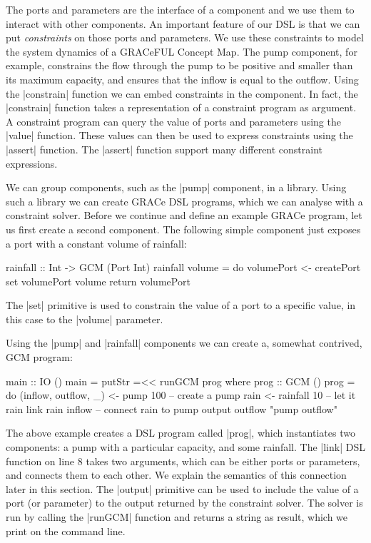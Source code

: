 \documentclass{article}
\begin{document}
The ports and parameters are the interface of a component and we use
them to interact with other components.
%
An important feature of our DSL is that we can put \emph{constraints}
on those ports and parameters.
%
We use these constraints to model the system dynamics of a GRACeFUL
Concept Map.
%
The pump component, for example, constrains the flow through the pump
to be positive and smaller than its maximum capacity, and ensures that
the inflow is equal to the outflow.
%
Using the |constrain| function we can embed constraints in the
component.
%
In fact, the |constrain| function takes a representation of a
constraint program as argument.
%
A constraint program can query the value of ports and parameters using
the |value| function.
%
These values can then be used to express constraints using the
|assert| function.
%
The |assert| function support many different constraint expressions.

We can group components, such as the |pump| component, in a library.
%
Using such a library we can create GRACe DSL programs, which we can
analyse with a constraint solver.
%
Before we continue and define an example GRACe program, let us first
create a second component.
%
The following simple component just exposes a port with a constant
volume of rainfall:
%
\begin{haskellcode}
rainfall :: Int -> GCM (Port Int)
rainfall volume = do
  volumePort <- createPort
  set volumePort volume
  return volumePort
\end{haskellcode}
%
The |set| primitive is used to constrain the value of a port to a
specific value, in this case to the |volume| parameter.

Using the |pump| and |rainfall| components we can create a, somewhat
contrived, \ac{GCM} program:
%
\begin{haskellcode}
main :: IO ()
main = putStr =<< runGCM prog
  where
    prog :: GCM ()
    prog = do
      (inflow, outflow, _) <- pump 100  -- create a pump
      rain <- rainfall 10               -- let it rain
      link rain inflow                  -- connect rain to pump
      output outflow "pump outflow"
\end{haskellcode}
%
The above example creates a DSL program called |prog|, which
instantiates two components: a pump with a particular capacity, and
some rainfall.
%
The |link| DSL function on line 8 takes two arguments, which can be
either ports or parameters, and connects them to each other.
%
We explain the semantics of this connection later in this section.
%
The |output| primitive can be used to include the value of a port (or
parameter) to the output returned by the constraint solver.
%
The solver is run by calling the |runGCM| function and returns a
string as result, which we print on the command line.
\end{document}
